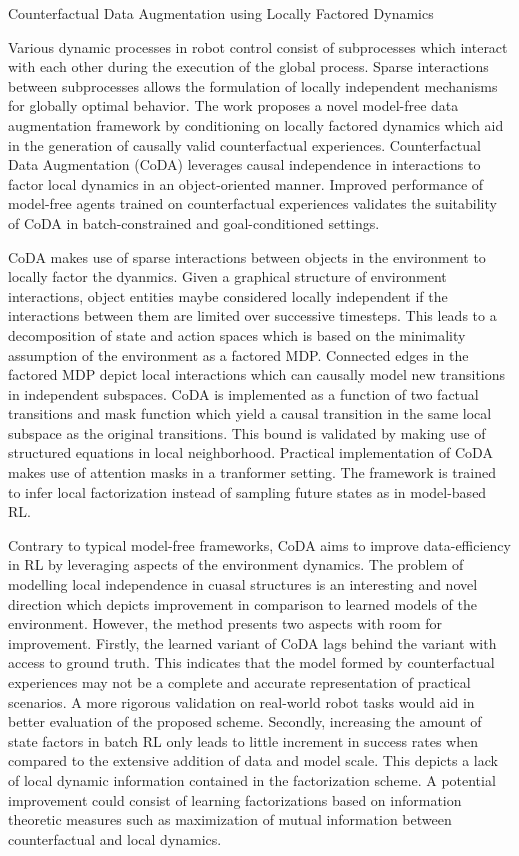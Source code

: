 \documentclass[11pt,letterpaper]{article}
\begin{document}
\begin{center}
  \large{Counterfactual Data Augmentation using Locally Factored Dynamics}
\end{center}

Various dynamic processes in robot control consist of subprocesses which interact with each other during the execution of the global process. Sparse interactions between subprocesses allows the formulation of locally independent mechanisms for globally optimal behavior. The work proposes a novel model-free data augmentation framework by conditioning on locally factored dynamics which aid in the generation of causally valid counterfactual experiences. Counterfactual Data Augmentation (CoDA) leverages causal independence in interactions to factor local dynamics in an object-oriented manner. Improved performance of model-free agents trained on counterfactual experiences validates the suitability of CoDA in batch-constrained and goal-conditioned settings. 

CoDA makes use of sparse interactions between objects in the environment to locally factor the dyanmics. Given a graphical structure of environment interactions, object entities maybe considered locally independent if the interactions between them are limited over successive timesteps. This leads to a decomposition of state and action spaces which is based on the minimality assumption of the environment as a factored MDP. Connected edges in the factored MDP depict local interactions which can causally model new transitions in independent subspaces. CoDA is implemented as a function of two factual transitions and mask function which yield a causal transition in the same local subspace as the original transitions. This bound is validated by making use of structured equations in local neighborhood. Practical implementation of CoDA makes use of attention masks in a tranformer setting. The framework is trained to infer local factorization instead of sampling future states as in model-based RL. 

Contrary to typical model-free frameworks, CoDA aims to improve data-efficiency in RL by leveraging aspects of the environment dynamics. The problem of modelling local independence in cuasal structures is an interesting and novel direction which depicts improvement in comparison to learned models of the environment. However, the method presents two aspects with room for improvement. Firstly, the learned variant of CoDA lags behind the variant with access to ground truth. This indicates that the model formed by counterfactual experiences may not be a complete and accurate representation of practical scenarios. A more rigorous validation on real-world robot tasks would aid in better evaluation of the proposed scheme. Secondly, increasing the amount of state factors in batch RL only leads to little increment in success rates when compared to the extensive addition of data and model scale. This depicts a lack of local dynamic information contained in the factorization scheme. A potential improvement could consist of learning factorizations based on information theoretic measures such as maximization of mutual information between counterfactual and local dynamics. 
\end{document}
